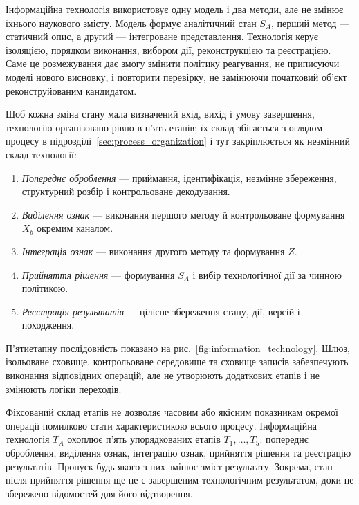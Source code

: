 Інформаційна технологія використовує одну модель і два методи, але не змінює їхнього наукового змісту. Модель формує аналітичний стан $S_A$, перший метод --- статичний опис, а другий --- інтегроване представлення. Технологія керує ізоляцією, порядком виконання, вибором дії, реконструкцією та реєстрацією. Саме це розмежування дає змогу змінити політику реагування, не приписуючи моделі нового висновку, і повторити перевірку, не замінюючи початковий об’єкт реконструйованим кандидатом.

Щоб кожна зміна стану мала визначений вхід, вихід і умову завершення, технологію організовано рівно в п’ять етапів; їх склад збігається з оглядом процесу в підрозділі~\ref{sec:process_organization} і тут закріплюється як незмінний склад технології:

\begin{enumerate}
\item \textit{Попереднє оброблення} --- приймання, ідентифікація, незмінне збереження, структурний розбір і контрольоване декодування.
\item \textit{Виділення ознак} --- виконання першого методу й контрольоване формування $X_b$ окремим каналом.
\item \textit{Інтеграція ознак} --- виконання другого методу та формування $Z$.
\item \textit{Прийняття рішення} --- формування $S_A$ і вибір технологічної дії за чинною політикою.
\item \textit{Реєстрація результатів} --- цілісне збереження стану, дії, версій і походження.
\end{enumerate}

П’ятиетапну послідовність показано на рис.~\ref{fig:information_technology}. Шлюз, ізольоване сховище, контрольоване середовище та сховище записів забезпечують виконання відповідних операцій, але не утворюють додаткових етапів і не змінюють логіки переходів.



Фіксований склад етапів не дозволяє часовим або якісним показникам окремої операції помилково стати характеристикою всього процесу. Інформаційна технологія $T_A$ охоплює п’ять упорядкованих етапів $T_1,\ldots,T_5$: попереднє оброблення, виділення ознак, інтеграцію ознак, прийняття рішення та реєстрацію результатів. Пропуск будь-якого з них змінює зміст результату. Зокрема, стан після прийняття рішення ще не є завершеним технологічним результатом, доки не збережено відомостей для його відтворення.


